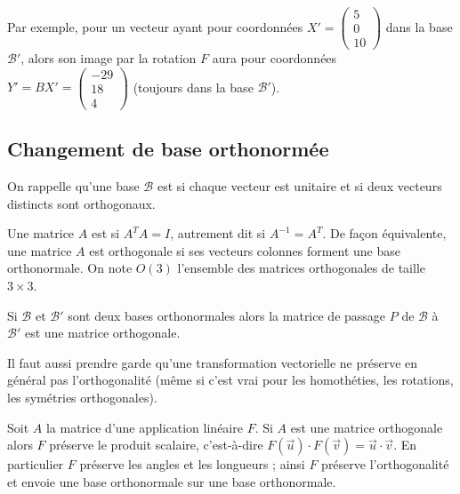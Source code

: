 \documentclass[11pt,class=report,crop=false]{standalone}
\begin{document}
\begin{exemple}
Par exemple, pour un vecteur ayant pour coordonnées 
$X ' = \left(\begin{smallmatrix} 5 \\ 0 \\10 \end{smallmatrix}\right)$ dans la base $\mathcal{B}'$, alors son image par la rotation $F$ aura pour coordonnées $Y' = B X' = \left(\begin{smallmatrix} -29 \\ 18 \\ 4 \end{smallmatrix}\right)$ (toujours dans la base $\mathcal{B}'$).

\end{exemple}

\subsection{Changement de base orthonormée}

On rappelle qu'une base $\mathcal{B}$ est  si chaque vecteur est unitaire et si deux vecteurs distincts sont orthogonaux.

Une matrice $A$ est  si $A^TA = I$, autrement dit si $A^{-1} = A^T$. 
De façon équivalente, une matrice $A$ est orthogonale si ses vecteurs colonnes forment une base orthonormale.
On note $O(3)$ l'ensemble des matrices orthogonales de taille $3\times3$.

\begin{proposition} 
Si $\mathcal{B}$ et $\mathcal{B}'$ sont deux bases orthonormales alors la matrice de passage $P$ de $\mathcal{B}$ à $\mathcal{B}'$ est une matrice orthogonale.
\end{proposition}




Il faut aussi prendre garde qu'une transformation vectorielle ne préserve en général pas l'orthogonalité (même si c'est vrai pour les homothéties, les rotations, les symétries orthogonales). 




\begin{proposition}
Soit $A$ la matrice d'une application linéaire $F$. 
Si $A$ est une matrice orthogonale alors $F$ préserve le produit scalaire, c'est-à-dire 
$ F(\vec u) \cdot F(\vec v) = \vec u \cdot \vec v$.
En particulier $F$ préserve les angles et les longueurs ; ainsi $F$ préserve l'orthogonalité et envoie une base orthonormale sur une base orthonormale.
\end{proposition} 
\end{document}
